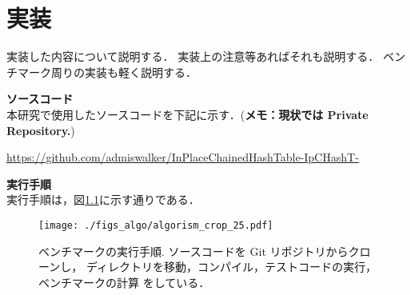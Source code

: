 \chapter{実装}
\label{chap_Implementation}

実装した内容について説明する．
実装上の注意等あればそれも説明する．
ベンチマーク周りの実装も軽く説明する．
\leavevmode \newline

{\bf ソースコード}
\samepage \\ \indent
本研究で使用したソースコードを下記に示す．({\bf \color{red}メモ：現状では Private Repository.})
\begin{center}
  \url{https://github.com/admiswalker/InPlaceChainedHashTable-IpCHashT-}
\end{center}

{\bf 実行手順}
\samepage \\ \indent
実行手順は，図\ref{fig_command}に示す通りである．
\vspace{-2mm}
\begin{figure}[h]
  \hspace{2mm}
  \texttt{[image: ./figs\_algo/algorism\_crop\_25.pdf]}
  \caption{
    ベンチマークの実行手順.
    ソースコードを Git リポジトリからクローンし，
    ディレクトリを移動，コンパイル，テストコードの実行，ベンチマークの計算
    をしている．
  }
  \label{fig_command}
\end{figure}

